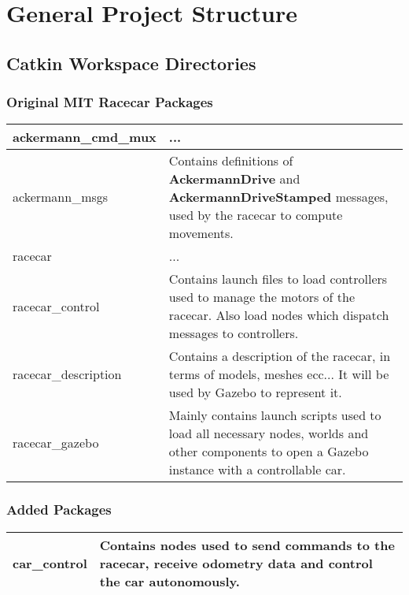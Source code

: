 \documentclass[12pt, letterpaper, oneside]{report}
\begin{document}
\chapter{General Project Structure}

\section{Catkin Workspace Directories}

\subsection{Original MIT Racecar Packages}

\begin{center}
	\begin{tabularx}{\textwidth}{
			| >{\raggedright\arraybackslash}X
			| >{\arraybackslash}X |
		}
		\hline
		ackermann\_cmd\_mux & ... \\
		\hline
		ackermann\_msgs & Contains definitions of \textbf{AckermannDrive} and \textbf{AckermannDriveStamped} messages, used by the racecar to compute movements. \\
		\hline
		racecar & ... \\
		\hline
		racecar\_control & Contains launch files to load controllers used to manage the motors of the racecar. Also load nodes which dispatch messages to controllers. \\
		\hline
		racecar\_description & Contains a description of the racecar, in terms of models, meshes ecc... It will be used by Gazebo to represent it. \\
		\hline
		racecar\_gazebo & Mainly contains launch scripts used to load all necessary nodes, worlds and other components to open a Gazebo instance with a controllable car. \\
		\hline
	\end{tabularx}
\end{center}

\subsection{Added Packages}

\begin{center}
	\begin{tabularx}{\textwidth}{
			| >{\raggedright\arraybackslash}X
			| >{\raggedright\arraybackslash}X |
		}
		\hline
		car\_control & Contains nodes used to send commands to the racecar, receive odometry data and control the car autonomously. \\
		\hline
	\end{tabularx}
\end{center}
\end{document}
